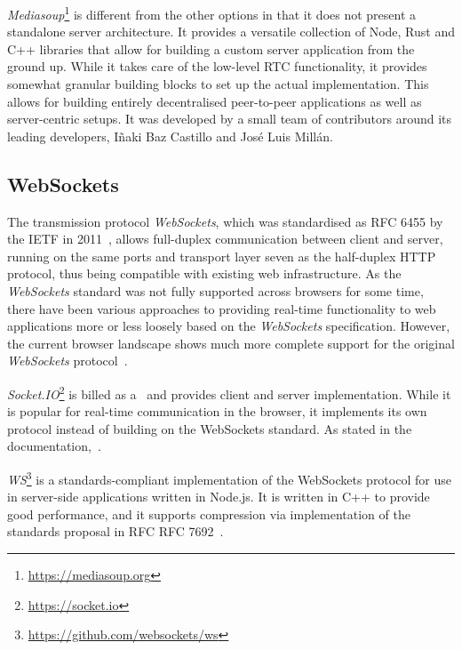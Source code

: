 \emph{Mediasoup}\footnote{\url{https://mediasoup.org}} is different from the other options in that it does not present a standalone server architecture.
It provides a versatile collection of Node, Rust and C++ libraries that allow for building a custom server application from the ground up.
While it takes care of the low-level \ac{RTC} functionality, it provides somewhat granular building blocks to set up the actual implementation.
This allows for building entirely decentralised peer-to-peer applications as well as server-centric setups.
It was developed by a small team of contributors around its leading developers, Iñaki Baz Castillo and José Luis Millán.

\subsection{WebSockets}

The transmission protocol \emph{WebSockets}, which was standardised as \ac{RFC} 6455 by the \ac{IETF} in 2011~\parencite{webSocketsProtocolRfc}, allows full-duplex communication between client and server, running on the same ports and transport layer seven as the half-duplex \ac{HTTP} protocol, thus being compatible with existing web infrastructure.
As the \emph{WebSockets} standard was not fully supported across browsers for some time, there have been various approaches to providing real-time functionality to web applications more or less loosely based on the \emph{WebSockets} specification.
However, the current browser landscape shows much more complete support for the original \emph{WebSockets} protocol~\parencite{canIUseWebSockets}.



\emph{Socket.IO}\footnote{\url{https://socket.io}} is billed as a~ and provides client and server implementation.
While it is popular for real-time communication in the browser, it implements its own protocol instead of building on the WebSockets standard.
As stated in the documentation,~.

\emph{WS}\footnote{\url{https://github.com/websockets/ws}} is a standards-compliant implementation of the WebSockets protocol for use in server-side applications written in Node.js.
It is written in C++ to provide good performance, and it supports compression via implementation of the standards proposal in \ac{RFC} RFC 7692~.

